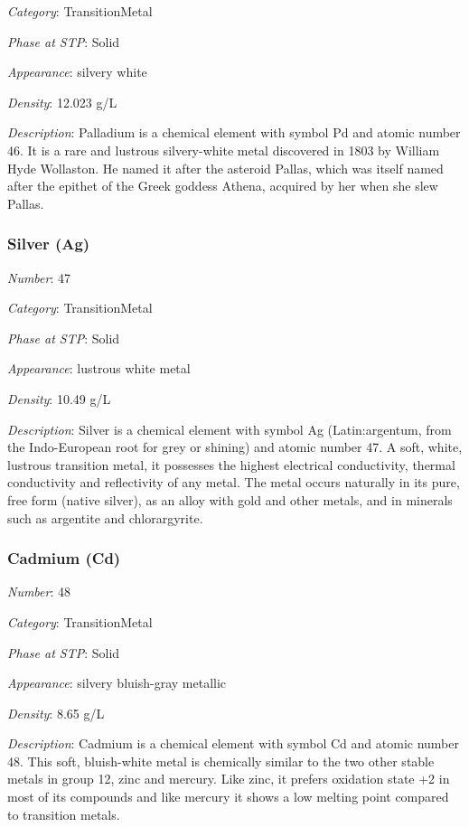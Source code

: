 \documentclass{article}
\begin{document}
\textit{Category}: TransitionMetal

\textit{Phase at STP}: Solid

\textit{Appearance}: silvery white

\textit{Density}: 12.023 g/L

\textit{Description}: Palladium is a chemical element with symbol Pd and atomic number 46. It is a rare and lustrous silvery-white metal discovered in 1803 by William Hyde Wollaston. He named it after the asteroid Pallas, which was itself named after the epithet of the Greek goddess Athena, acquired by her when she slew Pallas.

\hypertarget{subsubsection::Ag}{}\subsubsection{Silver (Ag)}

\textit{Number}: 47

\textit{Category}: TransitionMetal

\textit{Phase at STP}: Solid

\textit{Appearance}: lustrous white metal

\textit{Density}: 10.49 g/L

\textit{Description}: Silver is a chemical element with symbol Ag (Latin:argentum, from the Indo-European root for grey or shining) and atomic number 47. A soft, white, lustrous transition metal, it possesses the highest electrical conductivity, thermal conductivity and reflectivity of any metal. The metal occurs naturally in its pure, free form (native silver), as an alloy with gold and other metals, and in minerals such as argentite and chlorargyrite.

\hypertarget{subsubsection::Cd}{}\subsubsection{Cadmium (Cd)}

\textit{Number}: 48

\textit{Category}: TransitionMetal

\textit{Phase at STP}: Solid

\textit{Appearance}: silvery bluish-gray metallic

\textit{Density}: 8.65 g/L

\textit{Description}: Cadmium is a chemical element with symbol Cd and atomic number 48. This soft, bluish-white metal is chemically similar to the two other stable metals in group 12, zinc and mercury. Like zinc, it prefers oxidation state +2 in most of its compounds and like mercury it shows a low melting point compared to transition metals.
\end{document}
